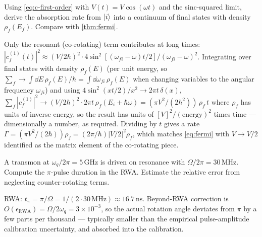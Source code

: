 \begin{exercise}
Using \cref{eq:c-first-order} with $V(t)=V\cos(\omega t)$ and the
sinc-squared limit, derive the absorption rate from $\ket i$ into
a continuum of final states with density $\rho_f(E_f)$. Compare
with \cref{thm:fermi}.
\begin{solution}
Only the resonant (co-rotating) term contributes at long times:
$|c_f^{(1)}(t)|^2\approx(V/2\hbar)^2\cdot 4\sin^2[(\omega_{fi}-\omega)t/2]/(\omega_{fi}-\omega)^2$.
Integrating over final states with density $\rho_f(E)$ (per unit
energy, so $\sum_f\to\int\dd E\,\rho_f(E)/\hbar=\int\dd\omega_{fi}\,\rho_f(E)$
when changing variables to the angular frequency $\omega_{fi}$)
and using $4\sin^2(xt/2)/x^2\to 2\pi t\,\delta(x)$,
$\sum_f|c_f^{(1)}|^2\to(V/2\hbar)^2 \cdot 2\pi t\,\rho_f(E_i+\hbar\omega)
=(\pi V^2/(2\hbar^2))\,\rho_f\,t$ where $\rho_f$ has units of
inverse energy, so the result has units of $[V]^2/(\text{energy})^2$
times time --- dimensionally a number, as required. Dividing by
$t$ gives a rate $\Gamma=(\pi V^2/(2\hbar))\rho_f=(2\pi/\hbar)|V/2|^2\rho_f$,
which matches \cref{eq:fermi} with $V\to V/2$ identified as the
matrix element of the co-rotating
piece.
\end{solution}
\end{exercise}

\begin{exercise}
A transmon at $\omega_q/2\pi=5\,\text{GHz}$ is driven on resonance
with $\Omega/2\pi=30\,\text{MHz}$. Compute the $\pi$-pulse duration
in the RWA. Estimate the relative error from neglecting
counter-rotating terms.
\begin{solution}
RWA: $t_\pi=\pi/\Omega=1/(2\cdot 30\,\text{MHz})\approx 16.7\,\text{ns}$.
Beyond-RWA correction is $O(\epsilon_\text{RWA})=\Omega/2\omega_q=
3\times 10^{-3}$, so the actual rotation angle deviates from $\pi$
by a few parts per thousand --- typically smaller than the
empirical pulse-amplitude calibration uncertainty, and absorbed
into the calibration.
\end{solution}
\end{exercise}

